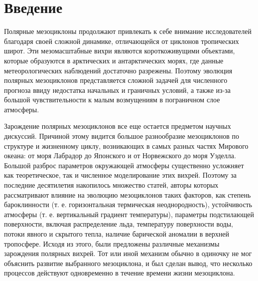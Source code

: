 %
\chapter*{Введение}

Полярные мезоциклоны продолжают привлекать к себе внимание исследователей благодаря своей сложной динамике, отличающейся от циклонов тропических широт. Эти мезомасштабные вихри являются короткоживущими объектами, которые образуются в арктических и антарктических морях, где данные метеорологических наблюдений достаточно разрежены. Поэтому эволюция полярных мезоциклонов представляется сложной задачей для численного прогноза ввиду недостатка начальных и граничных условий, а также из-за большой чувствительности к малым возмущениям в пограничном слое атмосферы.

Зарождение полярных мезоциклонов все еще остается предметом научных дискуссий. Причиной этому видится большое разнообразие мезоциклонов по структуре и жизненному циклу, возникающих в самых разных частях Мирового океана: от моря Лабрадор до Японского и от Норвежского до моря Уэделла. Большой разброс параметров окружающей атмосферы существенно усложняет как теоретическое, так и численное моделирование этих вихрей. Поэтому за последние десятилетия накопилось множество статей, авторы которых рассматривают влияние на эволюцию мезоциклонов таких факторов, как степень бароклинности (т. е. горизонтальная термическая неоднородность), устойчивость атмосферы (т. е. вертикальный градиент температуры), параметры подстилающей поверхности, включая распределение льда, температуру поверхности воды, потоки явного и скрытого тепла, наличие барической аномалии в верхней тропосфере. Исходя из этого, были предложены различные механизмы зарождения полярных вихрей. Тот или иной механизм обычно в одиночку не мог объяснить развитие выбранного мезоциклона, и был сделан вывод, что несколько процессов действуют одновременно в течение времени жизни мезоциклона.

